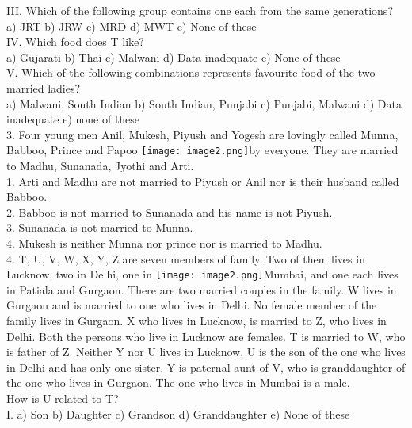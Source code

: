 \documentclass[
]{article}
\begin{document}
III. Which of the following group contains one each from the same generations?\\
a) JRT \hspace{2mm}b) JRW \hspace{2mm}c) MRD \hspace{2mm}d) MWT \hspace{2mm}e) None of these\\

IV. Which food does T like?\\
a) Gujarati \hspace{2mm}b) Thai \hspace{2mm}c) Malwani \hspace{2mm}d) Data inadequate \hspace{2mm}e) None of these\\

V. Which of the following combinations represents favourite food of the two married
ladies?\\
a) Malwani, South Indian \hspace{2mm}b) South Indian, Punjabi
\hspace{2mm}c) Punjabi, Malwani \hspace{2mm}d) Data inadequate
\hspace{2mm}e) none of these\\

3. Four young men Anil, Mukesh, Piyush and Yogesh are lovingly called Munna, Babboo,
Prince and Papoo \texttt{[image: image2.png]}by everyone. They are married to Madhu, Sunanada, Jyothi and Arti.\\
1. Arti and Madhu are not married to Piyush or Anil nor is their husband called
Babboo.\\
2. Babboo is not married to Sunanada and his name is not Piyush.\\
3. Sunanada is not married to Munna.\\
4. Mukesh is neither Munna nor prince nor is married to Madhu.\\

4. T, U, V, W, X, Y, Z are seven members of family. Two of them lives in Lucknow, two in Delhi,
one in \texttt{[image: image2.png]}Mumbai, and one each lives in Patiala and Gurgaon. There are two married couples in
the family. W lives in Gurgaon and is married to one who lives in Delhi. No female member
of the family lives in Gurgaon. X who lives in Lucknow, is married to Z, who lives in Delhi.
Both the persons who live in Lucknow are females. T is married to W, who is father of Z.
Neither Y nor U lives in Lucknow. U is the son of the one who lives in Delhi and has only one
sister. Y is paternal aunt of V, who is granddaughter of the one who lives in Gurgaon. The
one who lives in Mumbai is a male.\\
How is U related to T?\\
I. a) Son \hspace{2mm}b) Daughter \hspace{2mm}c) Grandson
\hspace{2mm}d) Granddaughter \hspace{2mm}e) None of these\\
\end{document}
